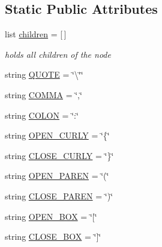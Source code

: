 \subsection*{Static Public Attributes}
\begin{DoxyCompactItemize}
\item 
list \mbox{\hyperlink{class_bridges_1_1_tree_element_1_1_tree_element_afdfe8877a4c29b5e4f8e983f176dd5de}{children}} = \mbox{[}$\,$\mbox{]}
\begin{DoxyCompactList}\small\item\em holds all children of the node \end{DoxyCompactList}\item 
string \mbox{\hyperlink{class_bridges_1_1_tree_element_1_1_tree_element_a9c4b0517bdd82b0f000c818ced4733c3}{Q\+U\+O\+TE}} = \char`\"{}\textbackslash{}\char`\"{}\char`\"{}
\item 
string \mbox{\hyperlink{class_bridges_1_1_tree_element_1_1_tree_element_aa0ec60ed2fefb6150c5c740545d3f39b}{C\+O\+M\+MA}} = \char`\"{},\char`\"{}
\item 
string \mbox{\hyperlink{class_bridges_1_1_tree_element_1_1_tree_element_a66dd123566230bda0032e0608822fbe1}{C\+O\+L\+ON}} = \char`\"{}\+:\char`\"{}
\item 
string \mbox{\hyperlink{class_bridges_1_1_tree_element_1_1_tree_element_a38e2f86ce23fcdf63c1c252c94fbe563}{O\+P\+E\+N\+\_\+\+C\+U\+R\+LY}} = \char`\"{}\{\char`\"{}
\item 
string \mbox{\hyperlink{class_bridges_1_1_tree_element_1_1_tree_element_a063039c1da36ba93e7c5050d564cdd01}{C\+L\+O\+S\+E\+\_\+\+C\+U\+R\+LY}} = \char`\"{}\}\char`\"{}
\item 
string \mbox{\hyperlink{class_bridges_1_1_tree_element_1_1_tree_element_a7fdab53f2a56df22ca48438a170563d4}{O\+P\+E\+N\+\_\+\+P\+A\+R\+EN}} = \char`\"{}(\char`\"{}
\item 
string \mbox{\hyperlink{class_bridges_1_1_tree_element_1_1_tree_element_a9af9144b58174fde286a56faaf89b7de}{C\+L\+O\+S\+E\+\_\+\+P\+A\+R\+EN}} = \char`\"{})\char`\"{}
\item 
string \mbox{\hyperlink{class_bridges_1_1_tree_element_1_1_tree_element_af223bc329cbb1b41ec8c1714b1feca4d}{O\+P\+E\+N\+\_\+\+B\+OX}} = \char`\"{}\mbox{[}\char`\"{}
\item 
string \mbox{\hyperlink{class_bridges_1_1_tree_element_1_1_tree_element_a044bbe06d6a6c0f87cea8e26add386d5}{C\+L\+O\+S\+E\+\_\+\+B\+OX}} = \char`\"{}\mbox{]}\char`\"{}
\end{DoxyCompactItemize}


